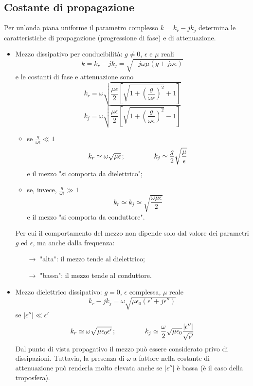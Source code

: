 \documentclass[a4paper]{article}
\begin{document}
\subsection*{Costante di propagazione}
Per un'onda piana uniforme il parametro complesso $k=k_r-jk_j$ determina le caratteristiche di propagazione (progressione di fase) e di attenuazione.
\begin{itemize}
\item Mezzo dissipativo per conducibilità: $g\neq0$, $\epsilon$ e $\mu$ reali
\begin{equation*}
k=k_r-jk_j=\sqrt{-j\omega\mu(g+j\omega\epsilon)}
\end{equation*}
e le costanti di fase e attenuazione sono
\begin{equation*}
k_r=\omega\sqrt{\frac{\mu\epsilon}{2}\left[\sqrt{1+\left(\frac{g}{\omega\epsilon}\right)^2}+1\right]}
\end{equation*}
\begin{equation*}
k_j=\omega\sqrt{\frac{\mu\epsilon}{2}\left[\sqrt{1+\left(\frac{g}{\omega\epsilon}\right)^2}-1\right]}
\end{equation*}
\begin{itemize}
\item se $\frac{g}{\omega\epsilon}\ll 1$
\begin{equation*}
k_r\simeq\omega\sqrt{\mu\epsilon}\,;\hspace{15mm}k_j\simeq\frac{g}{2}\sqrt{\frac{\mu}{\epsilon}}
\end{equation*}
e il mezzo "si comporta da dielettrico";
\item se, invece, $\frac{g}{\omega\epsilon}\gg 1$
\begin{equation*}
k_r\simeq k_j\simeq\sqrt{\frac{\omega\mu\epsilon}{2}}
\end{equation*}
e il mezzo "si comporta da conduttore".
\end{itemize}
Per cui il comportamento del mezzo non dipende solo dal valore dei parametri $g$ ed $\epsilon$, ma anche dalla frequenza:
\begin{itemize}
\item[$\rightarrow$] "alta": il mezzo tende al dielettrico;
\item[$\rightarrow$] "bassa": il mezzo tende al conduttore.
\end{itemize}
\item Mezzo dielettrico dissipativo: $g=0$, $\epsilon$ complessa, $\mu$ reale
\begin{equation*}
k_r-jk_j=\omega\sqrt{\mu\epsilon_0(\epsilon'+j\epsilon'')}
\end{equation*}
se $|\epsilon''|\ll\epsilon'$
\begin{equation*}
k_r\simeq\omega\sqrt{\mu\epsilon_0\epsilon'}\,;\hspace{15mm}k_j\simeq\frac{\omega}{2}\sqrt{\mu\epsilon_0}\frac{|\epsilon''|}{\sqrt{\epsilon'}}
\end{equation*}
Dal punto di vista propagativo il mezzo può essere considerato privo di dissipazioni. Tuttavia, la presenza di $\omega$ a fattore nella costante di attenuazione può renderla molto elevata anche se $|\epsilon''|$ è bassa (è il caso della troposfera).
\end{itemize}
\end{document}

